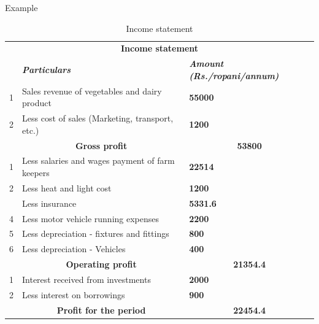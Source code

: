 \documentclass[12pt,ignorenonframetext,aspectratio=169]{beamer}
\begin{document}
\begin{frame}{Example}
\protect\hypertarget{example-1}{}
\begin{table}[H]

\caption{\label{tab:cost-return-an}Income statement}
\fontsize{6}{8}\selectfont
\begin{tabular}[t]{rll}
\toprule
\multicolumn{3}{c}{\textbf{Income statement}} \\
\cmidrule(l{3pt}r{3pt}){1-3}
\em{\textbf{}} & \em{\textbf{Particulars}} & \em{\textbf{Amount (Rs./ropani/annum)}}\\
\midrule
\rowcolor{gray!6}  1 & Sales revenue of vegetables and dairy product & \textcolor[HTML]{BBDF27}{\textbf{55000}}\\
2 & Less cost of sales (Marketing, transport, etc.) & \textcolor[HTML]{46065A}{\textbf{1200}}\\
\rowcolor{gray!6}  \multicolumn{1}{c}{\textbf{}} & \multicolumn{1}{c}{\textbf{Gross profit}} & \multicolumn{1}{c}{\textbf{\textcolor[HTML]{ADDC30}{\textbf{53800}}}}\\
1 & Less salaries and wages payment of farm keepers & \textcolor[HTML]{2D708E}{\textbf{22514}}\\
\rowcolor{gray!6}  2 & Less heat and light cost & \textcolor[HTML]{46065A}{\textbf{1200}}\\
\addlinespace
3 & Less insurance & \textcolor[HTML]{481E70}{\textbf{5331.6}}\\
\rowcolor{gray!6}  4 & Less motor vehicle running expenses & \textcolor[HTML]{460B5E}{\textbf{2200}}\\
5 & Less depreciation - fixtures and fittings & \textcolor[HTML]{450457}{\textbf{800}}\\
\rowcolor{gray!6}  6 & Less depreciation - Vehicles & \textcolor[HTML]{440154}{\textbf{400}}\\
\multicolumn{1}{c}{\textbf{}} & \multicolumn{1}{c}{\textbf{Operating profit}} & \multicolumn{1}{c}{\textbf{\textcolor[HTML]{2F6B8E}{\textbf{21354.4}}}}\\
\addlinespace
\rowcolor{gray!6}  1 & Interest received from investments & \textcolor[HTML]{460A5D}{\textbf{2000}}\\
2 & Less interest on borrowings & \textcolor[HTML]{450457}{\textbf{900}}\\
\rowcolor{gray!6}  \multicolumn{1}{c}{\textbf{}} & \multicolumn{1}{c}{\textbf{Profit for the period}} & \multicolumn{1}{c}{\textbf{\textcolor[HTML]{2D708E}{\textbf{22454.4}}}}\\
\bottomrule
\end{tabular}
\end{table}
\end{frame}
\end{document}
